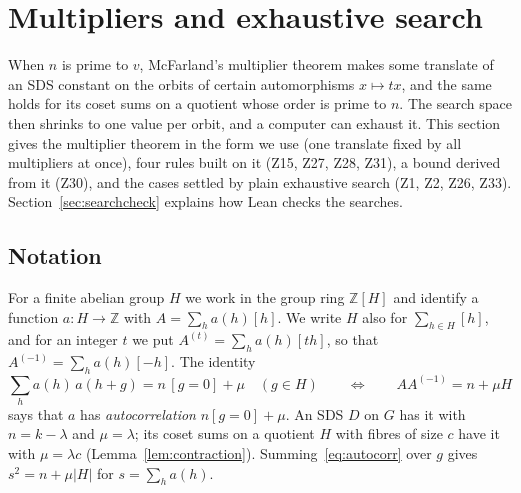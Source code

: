 
\section{Multipliers and exhaustive search}\label{sec:multipliers}

When $n$ is prime to $v$, McFarland's multiplier theorem makes some translate of an SDS
constant on the orbits of certain automorphisms $x \mapsto tx$, and the same holds for its
coset sums on a quotient whose order is prime to $n$. The search space then shrinks to one
value per orbit, and a computer can exhaust it. This section gives the multiplier theorem in
the form we use (one translate fixed by all multipliers at once), four rules built on it
(Z15, Z27, Z28, Z31), a bound derived from it (Z30), and the cases settled by plain exhaustive
search (Z1, Z2, Z26, Z33). Section~\ref{sec:searchcheck} explains how Lean checks the searches.

\subsection{Notation}
For a finite abelian group $H$ we work in the group ring $\mathbb{Z}[H]$ and identify a
function $a \colon H \to \mathbb{Z}$ with $A = \sum_h a(h)[h]$. We write $H$ also for
$\sum_{h \in H} [h]$, and for an integer $t$ we put $A^{(t)} = \sum_h a(h)[th]$, so that
$A^{(-1)} = \sum_h a(h)[-h]$. The identity
\begin{equation}\label{eq:autocorr}
  \sum_{h} a(h)\,a(h+g) = n\,[g = 0] + \mu \quad (g \in H)
  \qquad\Longleftrightarrow\qquad A A^{(-1)} = n + \mu H
\end{equation}
says that $a$ has \emph{autocorrelation} $n[g=0] + \mu$. An SDS $D$ on $G$ has it with
$n = k - \lambda$ and $\mu = \lambda$; its coset sums on a quotient $H$ with fibres of size
$c$ have it with $\mu = \lambda c$ (Lemma~\ref{lem:contraction}). Summing~\eqref{eq:autocorr}
over $g$ gives $s^2 = n + \mu |H|$ for $s = \sum_h a(h)$.

